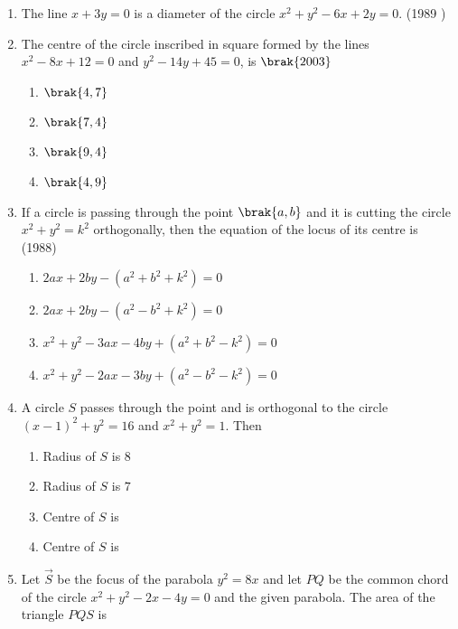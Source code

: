 	\begin{enumerate}
    \item The line $x+3y = 0$ is a diameter of the circle $ x^{2} + y^{2} - 6x +2y = 0$.
    \hfill{(1989 )}
     \item The centre of the circle inscribed in square formed by the lines $x^2-8x+12=0$ and $y^2-14y+45=0$,  is
         \hfill$\brak{2003}$
         \begin{multicols}{4}
\begin{enumerate}
         \item $\brak{4, 7}$
         \item $\brak{7, 4}$
         \item $\brak{9, 4}$
         \item $\brak{4, 9}$
     \end{enumerate}
     \end{multicols}
    \item If a circle is passing through the point $\brak{a, b}$ and it is cutting the circle $x^{2}+y^{2}=k^{2}$ orthogonally,  then the equation of the locus of its centre is 
    \hfill {(1988)}
    \begin{multicols}{2}
\begin{enumerate}
    	\item $2ax + 2by - (a^{2}+b^{2}+k^{2}) = 0$
    	\item $2ax + 2by - (a^{2}-b^{2}+k^{2}) = 0$
    	\item $x^{2} + y^{2}-3ax-4by+ (a^{2}+b^{2}-k^{2}) = 0$
    	\item $x^{2} + y^{2}-2ax-3by+ (a^{2}-b^{2}-k^{2}) = 0$
    \end{enumerate}
\end{multicols}
%
\item A circle $S$ passes through the point  and is orthogonal to the circle $(x-1)^2+y^2=16$ and $x^2+y^2=1$. Then
%
\hfill {}
\begin{multicols}{2}
\begin{enumerate}
\item Radius of $S$ is $8$
\item Radius of $S$ is $7$
\item Centre of $S$ is 
\item Centre of $S$ is 
\end{enumerate}
\end{multicols}
\item Let $\Vec{S}$ be the focus of the parabola $y^2=8x$ and let $PQ$ be the common chord of the circle $x^2+y^2-2x-4y=0$ and the given parabola. The area of the triangle $PQS$ is


\end{enumerate}
